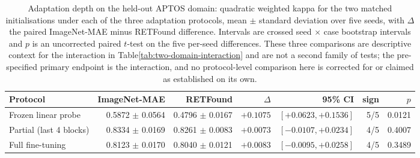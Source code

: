 \begin{table}[t]
\centering
\caption{Adaptation depth on the held-out APTOS domain: quadratic weighted kappa for the two matched initialisations under each of the three adaptation protocols, mean $\pm$ standard deviation over five seeds, with $\Delta$ the paired ImageNet-MAE minus RETFound difference. Intervals are crossed seed $\times$ case bootstrap intervals and $p$ is an uncorrected paired $t$-test on the five per-seed differences. These three comparisons are descriptive context for the interaction in Table\~\ref{tab:two-domain-interaction} and are not a second family of tests; the pre-specified primary endpoint is the interaction, and no protocol-level comparison here is corrected for or claimed as established on its own.}
\label{tab:aptos-adaptation-depth}
\begin{tabular}{lrrrrrr}
\toprule
Protocol & ImageNet-MAE & RETFound & $\Delta$ & 95\% CI & sign & $p$ \\
\midrule
Frozen linear probe & 0.5872 $\pm$ 0.0564 & 0.4796 $\pm$ 0.0167 & $+0.1075$ & $[+0.0623, +0.1536]$ & 5/5 & 0.0121 \\
Partial (last 4 blocks) & 0.8334 $\pm$ 0.0169 & 0.8261 $\pm$ 0.0083 & $+0.0073$ & $[-0.0107, +0.0234]$ & 4/5 & 0.4007 \\
Full fine-tuning & 0.8123 $\pm$ 0.0170 & 0.8040 $\pm$ 0.0121 & $+0.0083$ & $[-0.0095, +0.0258]$ & 4/5 & 0.3489 \\
\bottomrule
\end{tabular}
\end{table}

